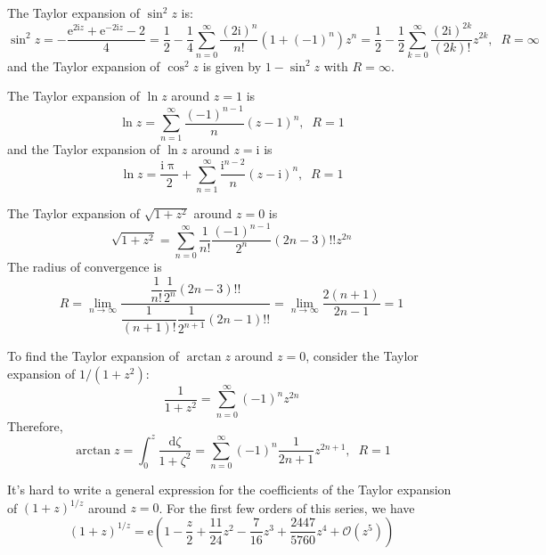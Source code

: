 \documentclass[]{ctexart}
\begin{document}
	The Taylor expansion of $\sin^2z$ is:
	\begin{equation*}
	\sin^2 z=-\frac{\mathrm{e}^{2\mathrm{i}z}+\mathrm{e}^{-2\mathrm{i}z}-2}{4}=\frac 12-\frac 14\sum_{n=0}^\infty\frac{(2\mathrm{i})^n}{n!}(1+(-1)^n)z^n=\frac 12-\frac 12\sum_{k=0}^\infty\frac{(2\mathrm{i})^{2k}}{(2k)!}z^{2k},\;\;R=\infty
	\end{equation*}
	and the Taylor expansion of $\cos^2z$ is given by $1-\sin^2z$ with $R=\infty$. 
	
	The Taylor expansion of $\ln z$ around $z=1$ is 
	\begin{equation*}
	\ln z=\sum_{n=1}^\infty\frac{(-1)^{n-1}}{n}(z-1)^n,\;\;R=1
	\end{equation*}
	and the Taylor expansion of $\ln z$ around $z=\mathrm{i}$ is 
	\begin{equation*}
	\ln z=\frac{\mathrm{i}\uppi}{2}+\sum_{n=1}^\infty\frac{\mathrm{i}^{n-2}}{n}(z-\mathrm{i})^n,\;\;R=1
	\end{equation*}
	
	The Taylor expansion of $\sqrt{1+z^2}$ around $z=0$ is 
	\begin{equation*}
	\sqrt{1+z^2}=\sum_{n=0}^\infty\frac{1}{n!}\frac{(-1)^{n-1}}{2^n}(2n-3)!!z^{2n}
	\end{equation*}
	The radius of convergence is 
	\begin{equation*}
	R=\lim_{n\to\infty}\frac{\dfrac{1}{n!}\dfrac{1}{2^n}(2n-3)!!}{\dfrac{1}{(n+1)!}\dfrac{1}{2^{n+1}}(2n-1)!!}=\lim_{n\to\infty}\frac{2(n+1)}{2n-1}=1
	\end{equation*}
	
	To find the Taylor expansion of $\arctan z$ around $z=0$, consider the Taylor expansion of $1/(1+z^2)$: 
	\begin{equation*}
	\frac{1}{1+z^2}=\sum_{n=0}^\infty(-1)^nz^{2n}
	\end{equation*}
	Therefore, 
	\begin{equation*}
	\arctan z=\int_0^z\frac{\mathrm{d}\zeta}{1+\zeta^2}=\sum_{n=0}^\infty(-1)^n\frac{1}{2n+1}z^{2n+1},\;\;R=1
	\end{equation*}
	
	It's hard to write a general expression for the coefficients of the Taylor expansion of $(1+z)^{1/z}$ around $z=0$. For the first few orders of this series, we have 
	\begin{equation*}
	(1+z)^{1/z}=\mathrm{e}\left(1-\frac z2+\frac{11}{24}z^2-\frac 7{16}z^3+\frac{2447}{5760}z^4+\mathcal O(z^5)\right)
	\end{equation*}
\end{document}
